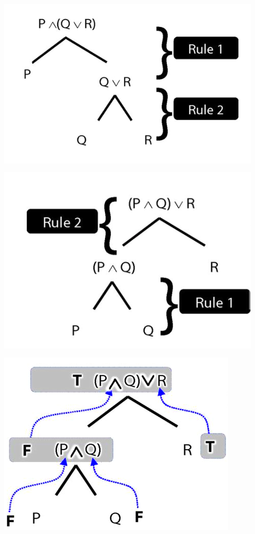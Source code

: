 \documentclass[12pt]{extarticle}
\begin{document}
\begin{multicols*}{3}
\begin{center}
\includegraphics[scale=0.3]{img/unit_230_tree1.png}
\end{center}
\begin{center}
\includegraphics[scale=0.3]{img/unit_230_tree2.png}
\end{center}
\begin{center}
\includegraphics[scale=0.3]{img/unit_230_tree_tt.png}
\end{center}
 

\end{multicols*}
\end{document}
